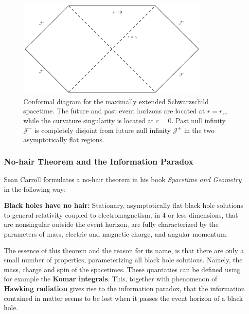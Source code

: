 \begin{figure}[h!]
%
\centering
%
\includegraphics[width=0.86\textwidth]{../pics/SW_stat_Pen.png}
%
\caption{Conformal diagram for the maximally extended Schwarzschild spacetime. The future and past event horizons are located at $r=r_s$, while the curvature singularity is located at $r=0$. Past null infinity $\mathcal{J}^-$ is completely disjoint from future null infinity $\mathcal{J}^+$ in the two asymptotically flat regions.}
%
\label{fig:conformal_SW}
%
\end{figure}
%
%
%

\subsubsection{No-hair Theorem and the Information Paradox}
%
%
%
Sean Carroll formulates a no-hair theorem in his book \textit{Spacetime and Geometry} in the following way:
%
\theoremstyle{theorem}
%
\begin{theorem}{\textbf{Black holes have no hair:}}
Stationary, asymptotically flat black hole solutions to general relativity coupled to electromagnetism, in 4 or less dimensions, that are nonsingular outside the event horizon, are fully characterized by the parameters of mass, electric and magnetic charge, and angular momentum. \cite{GR} %
\end{theorem}
%
%
\noindent
The essence of this theorem and the reason for its name, is that there are only a small number of properties, parameterizing all black hole solutions. Namely, the mass, charge and spin of the spacetimes. These quantaties can be defined using for example the \textbf{Komar integrals}. This, together with phenomenon of \textbf{Hawking radiation} gives rise to the information paradox, that the information contained in matter seems to be lost when it passes the event horizon of a black hole.


